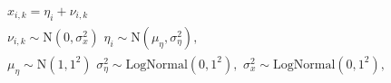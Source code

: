 \begin{equation}
\begin{gathered}
  x_{i, k} = \eta_{i} + \nu_{i, k}  \\
  \nu_{i, k} \sim \text{N}(0, \sigma^{2}_{x}) \,\,
  \eta_{i} \sim \text{N}(\mu_{\eta}, \sigma^{2}_{\eta}), \\
  \mu_{\eta} \sim \text{N}(1, 1^2) \,\,
  \sigma^{2}_{\eta} \sim \text{LogNormal}(0, 1^2), \,\,
  \sigma^{2}_{x} \sim \text{LogNormal}(0, 1^2),
\end{gathered}
\label{eqn:submodel-three-model}
\end{equation}